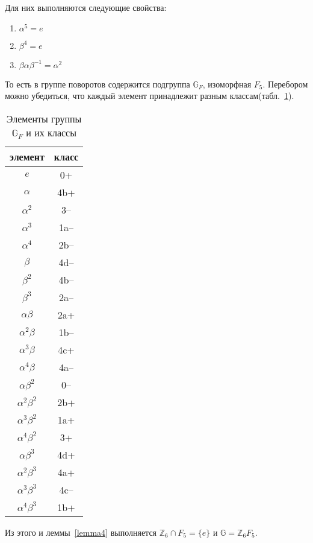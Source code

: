 \documentclass[utf8,a4paper,draft]{article}
\newtheorem{lemma_cub}{Лемма}
\begin{document}
Для них выполняются следующие свойства:
\begin{enumerate}
\item $\alpha^5=e$
\item $\beta^4=e$
\item $\beta\alpha\beta^{-1}=\alpha^2$
\end{enumerate}
То есть в группе поворотов содержится подгруппа $\mathbb{G}_F$, изоморфная $F_5$. Перебором можно убедиться, что каждый элемент принадлежит разным классам(табл.~\ref{elt}).
\begin{table}[h]
\begin{center}
  \begin{tabular}{| c | c |}
    \hline
    элемент & класс\\\hline
        $e$ & 0+  \\\hline
        $\alpha$ & 4b+ \\\hline
      $\alpha^2$ & 3-- \\\hline
      $\alpha^3$ & 1a--\\\hline
      $\alpha^4$ & 2b--\\\hline
        $\beta$ & 4d--\\\hline
      $\beta^2$ & 4b--\\\hline
      $\beta^3$ & 2a--\\\hline
       $\alpha\beta$ & 2a+ \\\hline
     $\alpha^2\beta$ & 1b--\\\hline
     $\alpha^3\beta$ & 4c+ \\\hline
     $\alpha^4\beta$ & 4a--\\\hline
     $\alpha\beta^2$ & 0-- \\\hline
   $\alpha^2\beta^2$ & 2b+ \\\hline
   $\alpha^3\beta^2$ & 1a+ \\\hline
   $\alpha^4\beta^2$ & 3+  \\\hline
     $\alpha\beta^3$ & 4d+ \\\hline
   $\alpha^2\beta^3$ & 4a+ \\\hline
   $\alpha^3\beta^3$ & 4c--\\\hline
   $\alpha^4\beta^3$ & 1b+ \\\hline
  \end{tabular}
  \end{center}
  \caption{Элементы группы $\mathbb{G}_F$ и их классы\label{elt}}
\end{table}
Из этого и леммы~\ref{lemma4} выполняется $\mathbb{Z}_6\cap F_5=\{e\}$ и $\mathbb{G}=\mathbb{Z}_6F_5$.
\end{document}
